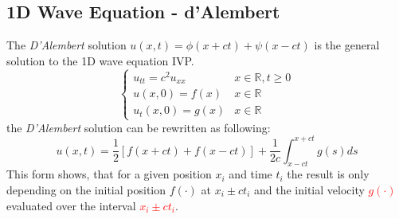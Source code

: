 \subsection{1D Wave Equation - d'Alembert}\label{ssec:1d_wave_Al}
The \textit{D'Alembert} solution $u(x,t) = \phi(x+ct)+\psi(x-ct)$ is the general solution to the 1D wave equation IVP.
\begin{equation*}
    \begin{cases}
        u_{tt} = c^2u_{xx} & x \in \mathbb{R}, t \geq 0 \\
        u(x,0) = f(x)      & x \in \mathbb{R}           \\
        u_t(x,0) = g(x)    & x \in \mathbb{R}
    \end{cases}
\end{equation*}
the \textit{D'Alembert} solution can be rewritten as following:
\begin{equation*}
    u(x,t)=\frac{1}{2}\left[f(x+ct)+f(x-ct)\right]+\frac{1}{2c}\int_{x-ct}^{x+ct}g(s)ds
\end{equation*}
This form shows, that for a given position $x_i$ and time $t_i$ the result is only depending on the initial position \textcolor{mathGreen}{$f(\cdot)$} at \textcolor{mathGreen}{$x_i\pm ct_i$} and the initial velocity \textcolor{red}{$g(\cdot)$} evaluated over the interval \textcolor{red}{$x_i\pm ct_i$}.
\begin{center}
\end{center}
